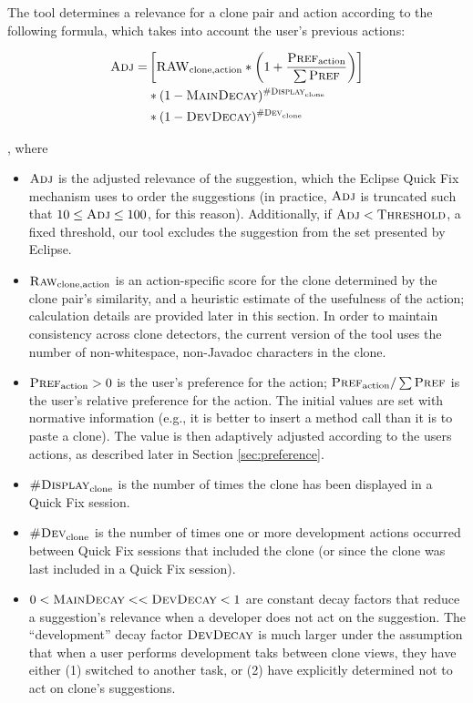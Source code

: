 \documentclass[nocopyrightspace,10pt]{sigplanconf}
\begin{document}
The tool determines a relevance for a clone pair and action according
to the following formula, which takes into account the user's previous
actions:

\begin{align*}
  \textsc{Adj} = & \left[ \textsc{RAW}_{\text{clone},\text{action}} * \left(1 + \frac{\textsc{Pref}_{\text{action}}}{\sum{\textsc{Pref}}}\right) \right] \\
      & * (1-\textsc{MainDecay})^{\textsc{\#Display}_{\text{clone}}} \\
      & * (1-\textsc{DevDecay})^{\textsc{\#Dev}_{\text{clone}}} 
\end{align*}

\noindent, where 
\begin{itemize}
  \item $\textsc{Adj}$ is the adjusted relevance of the suggestion, which the
    Eclipse Quick Fix mechanism uses to order the suggestions (in
    practice, $\textsc{Adj}$ is truncated such that $10 \le \textsc{Adj} \le 100$,
    for this reason). Additionally, if $\textsc{Adj} < \textsc{Threshold}$, a fixed threshold, our
    tool excludes the suggestion from the set presented
    by Eclipse.
  \item $\textsc{Raw}_{\text{clone},\text{action}}$ is an action-specific score for the clone
    determined by the clone pair's similarity, and a heuristic
    estimate of the usefulness of the action; calculation details
    are provided later in this section. 
    In order to maintain consistency across clone detectors, the current version of the tool uses the
    number of non-whitespace, non-Javadoc characters in the clone.
  \item $\textsc{Pref}_{\text{action}} > 0$ is the user's preference for the action; $\textsc{Pref}_{\text{action}} / 
    \sum{\textsc{Pref}}$ is the user's relative preference for the action. The
    initial values are set with normative information (e.g., it is
    better to insert a method call than it is to paste a clone). The
    value is then adaptively adjusted according to the users actions, as described
    later in Section \ref{sec:preference}.
  \item $\textsc{\#Display}_{\text{clone}}$ is the number of times the clone has been
    displayed in a Quick Fix session.
  \item $\textsc{\#Dev}_{\text{clone}}$ is the number of times one or more development
    actions occurred between Quick Fix sessions that included the
    clone (or since the clone was last included in a Quick Fix
    session).
  \item $0 < \textsc{MainDecay} << \textsc{DevDecay} < 1$ are constant
    decay factors that reduce a suggestion's relevance when a
    developer does not act on the suggestion. The ``development'' decay
    factor $\textsc{DevDecay}$ is much larger under the assumption
    that when a user performs development taks between clone views,
    they have either (1) switched to another task, or (2) have
    explicitly determined not to act on clone's suggestions.
\end{itemize} 
\end{document}
